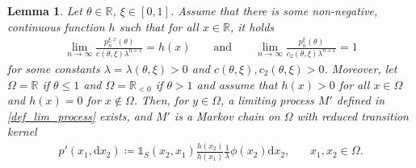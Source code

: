 \documentclass[12pt]{article}
\newcommand{\R}{\mathbb{R}} %
\newcommand{\1}{\mathds{1}}
\renewcommand{\d}{\mathrm{d}}
\theoremstyle{definition}
\theoremstyle{plain}
\newtheorem{Lemma}[definition]{Lemma}
\theoremstyle{remark}
\begin{document}
\begin{Lemma}\label{Kernel_lim_process}
 Let $\theta\in\R$, $\xi\in[0,1]$. Assume that there is some non-negative, continuous function $h$ such that for all $x\in\R$, it holds
\begin{align}\label{assumption_asymptotics}
   \lim_{n\to\infty}\frac{p_n^{\xi,x}(\theta)}{c(\theta,\xi)\lambda^{n+1}}= h(x) \qquad\text{and}\qquad
        \lim_{n\to\infty}\frac{p_n^{\xi}(\theta)}{c_2(\theta,\xi)\lambda^{n+1}}=1
\end{align}
for some constants $\lambda=\lambda(\theta,\xi)>0$ and $c(\theta,\xi),c_2(\theta,\xi)>0$.
Moreover, let $\Omega=\R$ if $\theta\le 1$ and $\Omega=\R_{<0}$ if $\theta>1$ and assume that $h(x)>0$ for all $x\in\Omega$ and $h(x)=0$ for $x\notin\Omega$. Then, for $y\in\Omega$, a limiting process $M'$ defined in \eqref{def_lim_process}
exists, and $M'$ is a Markov chain on $\Omega$ with reduced transition kernel 
\begin{align} \label{eqn:tkrefk}
    p'(x_1,\d x_2)\coloneqq \mathds{1}_S(x_2,x_{1})\frac{h(x_2)}{h(x_1)}\frac{1}{\lambda}\phi(x_2)\d x_2,~~~~~~~~x_1,x_2\in \Omega.
\end{align}
\end{Lemma}
\end{document}

